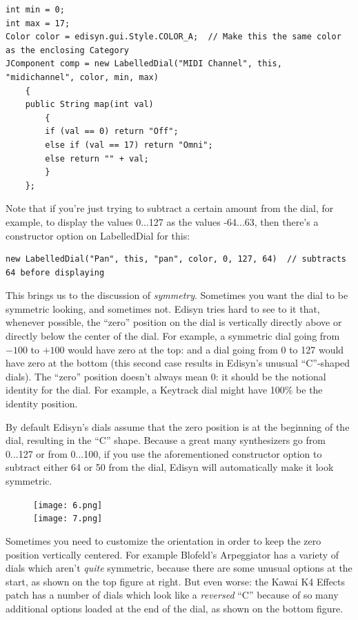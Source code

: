 \documentclass{article}
\begin{document}
\begin{itemize}
\begin{verbatim}
int min = 0;
int max = 17;
Color color = edisyn.gui.Style.COLOR_A;  // Make this the same color as the enclosing Category
JComponent comp = new LabelledDial("MIDI Channel", this, "midichannel", color, min, max)
    {
    public String map(int val)
        {
        if (val == 0) return "Off";
        else if (val == 17) return "Omni";
        else return "" + val;
        }
    };
\end{verbatim}

Note that if you're just trying to subtract a certain amount from the dial, for example, to display the values 0...127 as the values -64...63, then there's a constructor option on LabelledDial for this:

\begin{verbatim}
new LabelledDial("Pan", this, "pan", color, 0, 127, 64)  // subtracts 64 before displaying
\end{verbatim}

This brings us to the discussion of {\it symmetry}.  Sometimes you want the dial to be symmetric looking, and sometimes not.  Edisyn tries hard to see to it that, whenever possible, the ``zero'' position on the dial is vertically directly above or directly below the center of the dial.  For example, a symmetric dial going from \(-100\) to \(+100\) would have zero at the top: and a dial going from 0 to 127 would have zero at the bottom (this second case results in Edisyn's unusual ``C''-shaped dials).  The ``zero'' position doesn't always mean 0: it should be the notional identity for the dial.  For example, a Keytrack dial might have 100\% be the identity position.

By default Edisyn's dials assume that the zero position is at the beginning of the dial, resulting in the ``C'' shape.  Because a great many synthesizers go from 0...127 or from 0...100, if you use the aforementioned constructor option to subtract either 64 or 50 from the dial, Edisyn will automatically make it look symmetric.

\begin{minipage}{\linewidth}
\begin{figure}
\vspace{-1em}\texttt{[image: 6.png]}\\
\texttt{[image: 7.png]}
\vspace{-1em}
\end{figure}

Sometimes you need to customize the orientation in order to keep the zero position vertically centered. For example Blofeld's Arpeggiator has a variety of dials which aren't {\it quite} symmetric, because there are some unusual options at the start, as shown on the top figure at right.  But even worse: the Kawai K4 Effects patch has a number of dials which look like a {\it reversed} ``C'' because of so many additional options loaded at the end of the dial, as shown on the bottom figure.


\end{minipage}
\end{itemize}
\end{document}
